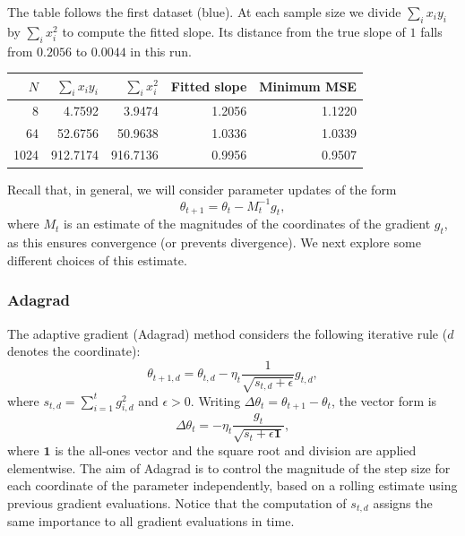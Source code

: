\begin{example}
The table follows the first dataset (blue). At each sample size we divide $\sum_i x_i y_i$ by $\sum_i x_i^2$ to compute the fitted slope. Its distance from the true slope of $1$ falls from $0.2056$ to $0.0044$ in this run.
\begin{center}
\begin{tabular}{rrrrr}
\hline
$N$ & $\sum_i x_i y_i$ & $\sum_i x_i^2$ & Fitted slope & Minimum MSE \\
\hline
8 & 4.7592 & 3.9474 & 1.2056 & 1.1220 \\
64 & 52.6756 & 50.9638 & 1.0336 & 1.0339 \\
1024 & 912.7174 & 916.7136 & 0.9956 & 0.9507 \\
\hline
\end{tabular}
\end{center}
\end{example}


Recall that, in general, we will consider parameter updates of the form 
\begin{equation}
	\theta_{t+1} = \theta_t -M_t^{-1} g_t,
\end{equation}
where $M_t$ is an estimate of the magnitudes of the coordinates of the gradient $g_t$, as this ensures convergence (or prevents divergence). We next explore some different choices of this estimate.

\subsubsection{Adagrad}

The adaptive gradient (Adagrad) method considers the following iterative rule ($d$ denotes the coordinate):  
\begin{equation}
	\theta_{t+1,d} = \theta_{t,d} - \eta_t \frac{1}{\sqrt{s_{t,d}+\epsilon}} g_{t,d},
\end{equation}
where $s_{t,d} = \sum_{i=1}^t g_{i,d}^2$ and $\epsilon>0$. Writing $\Delta\theta_t=\theta_{t+1}-\theta_t$, the vector form is
\begin{equation}
	\Delta \theta_t = -\eta_t \frac{g_t}{\sqrt{s_t+\epsilon\mathbf{1}}},
\end{equation}
where $\mathbf{1}$ is the all-ones vector and the square root and division are applied elementwise.
The aim of Adagrad is to control the magnitude of the step size for each coordinate of the parameter independently, based on a rolling estimate using previous gradient evaluations. Notice that the computation of $s_{t,d}$ assigns the same importance to all gradient evaluations in time.


